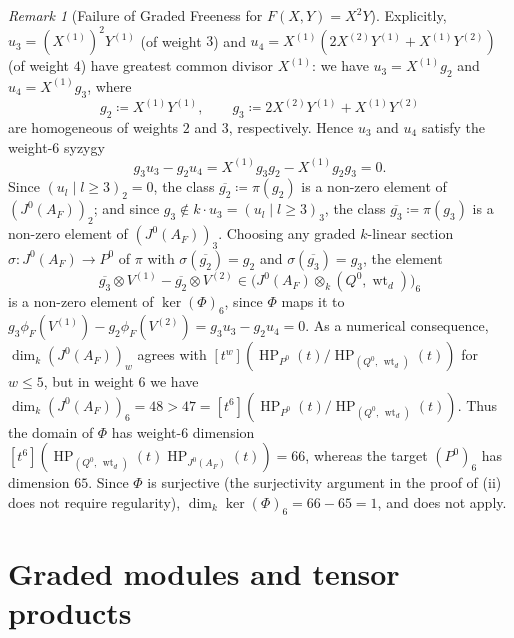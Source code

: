 \documentclass[a4paper, 12pt, reqno]{amsart}
\theoremstyle{remark}
\newtheorem{remark}[theorem]{Remark}
\begin{document}
\begin{remark}[Failure of Graded Freeness for $F(X, Y) = X^2 Y$]
  Explicitly,
  $u_3 = (X^{(1)})^2 Y^{(1)}$ (of weight $3$) and $u_4 = X^{(1)}(2X^{(2)}Y^{(1)} + X^{(1)}Y^{(2)})$ (of weight $4$) have greatest common divisor $X^{(1)}$:
  we have $u_3 = X^{(1)} g_2$ and $u_4 = X^{(1)} g_3$,
  where
  \begin{equation*}
    g_2 \coloneq X^{(1)}Y^{(1)}, \qquad
    g_3 \coloneq 2X^{(2)}Y^{(1)} + X^{(1)}Y^{(2)}
  \end{equation*}
  are homogeneous of weights $2$ and $3$, respectively.
  Hence $u_3$ and $u_4$ satisfy the weight-$6$ syzygy
  \begin{equation*}
    g_3 u_3 - g_2 u_4 = X^{(1)} g_3 g_2 - X^{(1)} g_2 g_3 = 0.
  \end{equation*}
  Since $(u_l \mid l \ge 3)_2 = 0$,
  the class $\overline{g_2} \coloneq \pi(g_2)$ is a non-zero element of $\left(J^0(A_F)\right)_2$;
  and since $g_3 \notin k \cdot u_3 = (u_l \mid l \ge 3)_3$,
  the class $\overline{g_3} \coloneq \pi(g_3)$ is a non-zero element of $\left(J^0(A_F)\right)_3$.
  Choosing any graded $k$-linear section $\sigma \colon J^0(A_F) \to P^0$ of $\pi$ with $\sigma(\overline{g_2}) = g_2$ and $\sigma(\overline{g_3}) = g_3$,
  the element
  \begin{equation*}
    \overline{g_3} \otimes V^{(1)} - \overline{g_2} \otimes V^{(2)} \in \bigl(J^0(A_F) \otimes_k (Q^0, \operatorname{wt}_d)\bigr)_6
  \end{equation*}
  is a non-zero element of $\ker(\Phi)_6$,
  since $\Phi$ maps it to $g_3 \phi_F(V^{(1)}) - g_2 \phi_F(V^{(2)}) = g_3 u_3 - g_2 u_4 = 0$.
  As a numerical consequence,
  $\dim_k\left(J^0(A_F)\right)_w$ agrees with $[t^w](\operatorname{HP}_{P^0}(t)/\operatorname{HP}_{(Q^0, \, \operatorname{wt}_d)}(t))$ for $w \le 5$,
  but in weight $6$ we have $\dim_k\left(J^0(A_F)\right)_6 = 48 > 47 = [t^6](\operatorname{HP}_{P^0}(t)/\operatorname{HP}_{(Q^0, \, \operatorname{wt}_d)}(t))$.
  Thus the domain of $\Phi$ has weight-$6$ dimension $[t^6]\left(\operatorname{HP}_{(Q^0, \, \operatorname{wt}_d)}(t)\operatorname{HP}_{J^0(A_F)}(t)\right) = 66$,
  whereas the target $(P^0)_6$ has dimension $65$.
  Since $\Phi$ is surjective
  (the surjectivity argument in the proof of (ii) does not require regularity),
  $\dim_k \ker(\Phi)_6 = 66 - 65 = 1$,
  and  does not apply.
\end{remark}

\appendix
\section{Graded modules and tensor products}
\label{app:graded-tensor-products}
\end{document}
